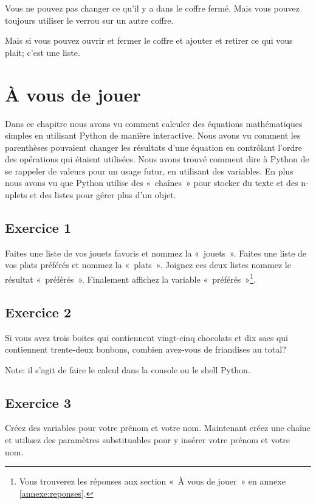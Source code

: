 Vous ne pouvez pas changer ce qu'il y a dans le coffre fermé. Mais vous pouvez toujours utiliser le verrou  sur un autre coffre.

Mais si vous pouvez ouvrir et fermer le coffre et ajouter et retirer ce qui vous plait; c'est une liste.

\section{À vous de jouer\label{PRATIQUE:8}}

Dans ce chapitre nous avons vu comment calculer des équations mathématiques simples en utilisant Python de manière interactive. Nous avons vu comment les parenthèses pouvaient changer les résultats d'une équation en contrôlant l'ordre des opérations qui étaient utilisées. Nous avons trouvé comment dire à Python de se rappeler de valeurs pour un usage futur, en utilisant des variables. En plus nous avons vu que Python utilise des «~chaînes~» pour stocker du texte et des n-uplets et des listes pour gérer plus d'un objet.

\subsection{Exercice 1}
Faites une liste de vos jouets favoris et nommez la «~jouets~». Faites une liste de vos plats préférés et nommez la «~plats~». Joignez ces deux listes nommez le résultat «~préférés~». Finalement affichez la variable «~préférés~»\footnote{Vous trouverez les réponses aux section «~À vous de jouer~» en annexe \ref{annexe:reponses}.}.

\subsection{Exercice 2}
Si vous avez trois boites qui contiennent vingt-cinq chocolats et dix sacs qui contiennent trente-deux bonbons, combien avez-vous de friandises au total? 

Note: il s'agit de faire le calcul dans la console ou le shell Python.

\subsection{Exercice 3}
Créez des variables pour votre prénom et votre nom. Maintenant créez une chaîne et utilisez des paramètres substituables pour y insérer votre prénom et votre nom.\\


